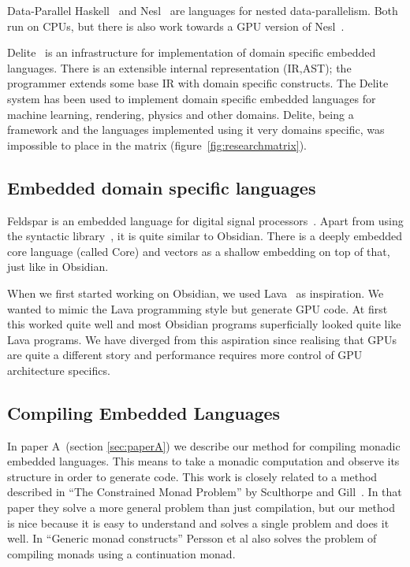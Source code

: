 \documentclass[a4paper]{book}
\begin{document}
Data-Parallel Haskell~\citet{DPH} and Nesl~\citet{NESL} are languages for 
nested data-parallelism. Both run on CPUs, but there is also work towards 
a GPU version of Nesl~\citet{NestedGPU}. 


Delite~\citet{DELITE} is an infrastructure for implementation of domain 
specific embedded languages. There is an extensible internal representation (IR,AST); 
the programmer extends some base IR with domain specific constructs. The Delite system 
has been used to implement domain specific embedded languages for machine learning, rendering, 
physics and other domains. Delite, being a framework and the languages implemented using it 
very domains specific, was impossible to place in the matrix (figure~\ref{fig:researchmatrix}). 

\subsection{Embedded domain specific languages} 

Feldspar is an embedded language for digital signal processors~\citet{FELDSPAR}. Apart 
from using the syntactic library~\citet{SyntacticICFP12}, it is quite similar to Obsidian. 
There is a deeply embedded core language (called Core) and vectors as a shallow embedding 
on top of that, just like in Obsidian.

When we first started working on Obsidian, we used Lava~\citet{LavaICFP} as inspiration. 
We wanted to mimic the Lava programming style but generate GPU code. At first this worked quite 
well and most Obsidian programs superficially looked quite like Lava programs. We have diverged 
from this aspiration since realising that GPUs are quite a different story and performance 
requires more control of GPU architecture specifics. 

\subsection{Compiling Embedded Languages}

In paper A~(section \ref{sec:paperA}) we describe our method for compiling monadic embedded 
languages. 
This means to take a monadic computation and observe its structure in order to generate
code. This work is closely related to a method described in ``The Constrained Monad Problem''
by Sculthorpe and Gill~\citet{sculthorpe2013constrained}. In that paper they solve a more 
general problem than just compilation, but our method is nice because it is easy to understand 
and solves a single problem and does it well. In ``Generic monad constructs'' Persson et al 
also solves the problem of compiling monads using a continuation monad. 
\end{document}
